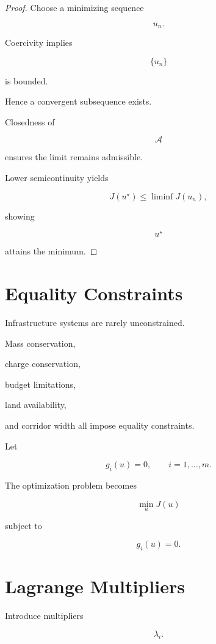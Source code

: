 \documentclass[11pt,fleqn]{book}
\numberwithin{equation}{chapter}
\theoremstyle{plain}
\theoremstyle{definition}
\theoremstyle{remark}
\begin{document}
\begin{proof}

Choose a minimizing sequence

\[
u_n.
\]

Coercivity implies

\[
\{u_n\}
\]

is bounded.

Hence a convergent subsequence exists.

Closedness of

\[
\mathcal A
\]

ensures the limit remains admissible.

Lower semicontinuity yields

\[
J(u^\star)
\le
\liminf
J(u_n),
\]

showing

\[
u^\star
\]

attains the minimum.

\end{proof}


\section{Equality Constraints}

Infrastructure systems are rarely unconstrained.

Mass conservation,

charge conservation,

budget limitations,

land availability,

and corridor width all impose equality constraints.

Let

\[
g_i(u)=0,
\qquad
i=1,\ldots,m.
\]

The optimization problem becomes

\[
\min_u
J(u)
\]

subject to

\[
g_i(u)=0.
\]


\section{Lagrange Multipliers}

Introduce multipliers

\[
\lambda_i.
\]
\end{document}

